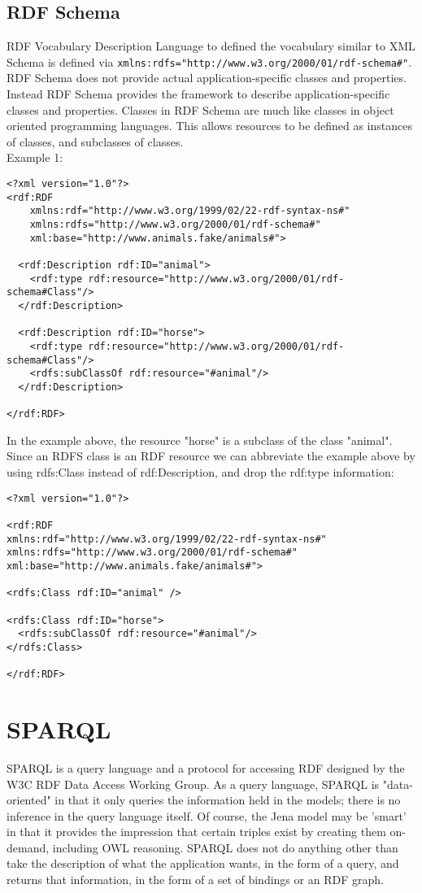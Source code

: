 \documentclass[11pt]{article}
\begin{document}
\subsection{RDF Schema}
\label{sec:org33bdb9e}
RDF Vocabulary Description Language to defined the vocabulary similar to XML Schema is defined via \texttt{xmlns:rdfs="http://www.w3.org/2000/01/rdf-schema\#"}. RDF Schema does not provide actual application-specific classes and properties. Instead RDF Schema provides the framework to describe application-specific classes and properties.
Classes in RDF Schema are much like classes in object oriented programming languages. This allows resources to be defined as instances of classes, and subclasses of classes.\\
Example 1:
\lstset{breaklines=true,language=XML,label= ,caption= ,captionpos=b,numbers=none}
\begin{lstlisting}
<?xml version="1.0"?>
<rdf:RDF
    xmlns:rdf="http://www.w3.org/1999/02/22-rdf-syntax-ns#"
    xmlns:rdfs="http://www.w3.org/2000/01/rdf-schema#"
    xml:base="http://www.animals.fake/animals#">

  <rdf:Description rdf:ID="animal">
    <rdf:type rdf:resource="http://www.w3.org/2000/01/rdf-schema#Class"/>
  </rdf:Description>

  <rdf:Description rdf:ID="horse">
    <rdf:type rdf:resource="http://www.w3.org/2000/01/rdf-schema#Class"/>
    <rdfs:subClassOf rdf:resource="#animal"/>
  </rdf:Description>

</rdf:RDF>
\end{lstlisting}
In the example above, the resource "horse" is a subclass of the class "animal". Since an RDFS class is an RDF resource we can abbreviate the example above by using rdfs:Class instead of rdf:Description, and drop the rdf:type information:
\lstset{breaklines=true,language=XML,label= ,caption= ,captionpos=b,numbers=none}
\begin{lstlisting}
<?xml version="1.0"?>

<rdf:RDF
xmlns:rdf="http://www.w3.org/1999/02/22-rdf-syntax-ns#"
xmlns:rdfs="http://www.w3.org/2000/01/rdf-schema#"
xml:base="http://www.animals.fake/animals#">

<rdfs:Class rdf:ID="animal" />

<rdfs:Class rdf:ID="horse">
  <rdfs:subClassOf rdf:resource="#animal"/>
</rdfs:Class>

</rdf:RDF>
\end{lstlisting}

\section{SPARQL}
\label{sec:orgc4fe191}
SPARQL is a query language and a protocol for accessing RDF designed by the W3C RDF Data Access Working Group. 
As a query language, SPARQL is "data-oriented" in that it only queries the information held in the models; there is no inference in the query language itself.  Of course, the Jena model may be 'smart' in that it provides the impression that certain triples exist by creating them on-demand, including OWL reasoning.  SPARQL does not do anything other than take the description of what the application wants, in the form of a query, and returns that information, in the form of a set of bindings or an RDF graph.
\end{document}
